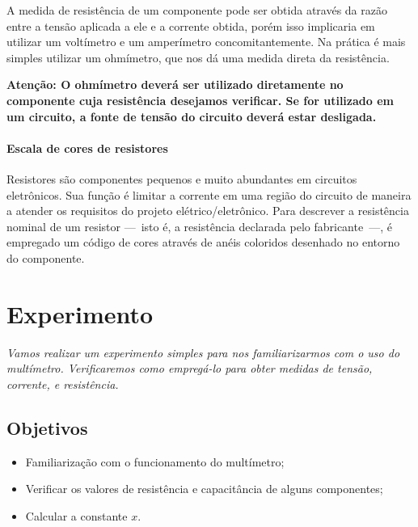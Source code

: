 A medida de resistência de um componente pode ser obtida através da razão entre a tensão aplicada a ele e a corrente obtida, porém isso implicaria em utilizar um voltímetro e um amperímetro concomitantemente. Na prática é mais simples utilizar um ohmímetro, que nos dá uma medida direta da resistência.

\textbf{Atenção: O ohmímetro deverá ser utilizado diretamente no componente cuja resistência desejamos verificar. Se for utilizado em um circuito, a fonte de tensão do circuito deverá estar desligada.}

\paragraph{Escala de cores de resistores}

Resistores são componentes pequenos e muito abundantes em circuitos eletrônicos. Sua função é limitar a corrente em uma região do circuito de maneira a atender os requisitos do projeto elétrico/eletrônico. Para descrever a resistência nominal de um resistor ---~isto é, a resistência declarada pelo fabricante~---, é empregado um código de cores através de anéis coloridos desenhado no entorno do componente.

\section{Experimento}

\emph{Vamos realizar um experimento simples para nos familiarizarmos com o uso do multímetro. Verificaremos como empregá-lo para obter medidas de tensão, corrente, e resistência.}

\subsection{Objetivos}

\begin{itemize}
	\item Familiarização com o funcionamento do multímetro;
	\item Verificar os valores de resistência e capacitância de alguns componentes;
	\item Calcular a constante $x$.
\end{itemize}

